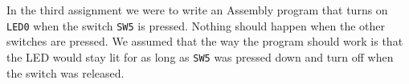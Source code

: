 In the third assignment we were to write an Assembly program that turns on \texttt{LED0} when the switch \texttt{SW5} is pressed. Nothing should happen when the other switches are pressed. We assumed that the way the program should work is that the LED would stay lit for as long as \texttt{SW5} was pressed down and turn off when the switch was released.
